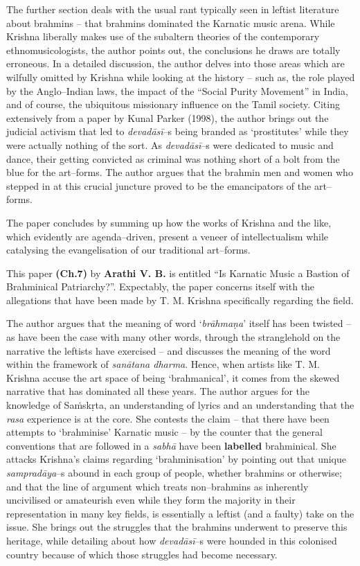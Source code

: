 The further section deals with the usual rant typically seen in leftist literature about brahmins – that brahmins dominated the Karnatic music arena. While Krishna liberally makes use of the subaltern theories of the contemporary ethnomusicologists, the author points out, the conclusions he draws are totally erroneous. In a detailed discussion, the author delves into those areas which are wilfully omitted by Krishna while looking at the history – such as, the role played by the Anglo–Indian laws, the impact of the “Social Purity Movement” in India, and of course, the ubiquitous missionary influence on the Tamil society. Citing extensively from a paper by Kunal Parker (1998), the author brings out the judicial activism that led to \textit{devadāsī}–s being branded as ‘prostitutes’ while they were actually nothing of the sort. As \textit{devadāsī}–s were dedicated to music and dance, their getting convicted as criminal was nothing short of a bolt from the blue for the art–forms. The author argues that the brahmin men and women who stepped in at this crucial juncture proved to be the emancipators of the art–forms.

The paper concludes by summing up how the works of Krishna and the like, which evidently are agenda–driven, present a veneer of intellectualism while catalysing the evangelisation of our traditional art–forms.

This paper \textbf{(Ch.7)} by \textbf{Arathi V. B.} is entitled “Is Karnatic Music a Bastion of Brahminical Patriarchy?”. Expectably, the paper concerns itself with the allegations that have been made by T. M. Krishna specifically regarding the field.

The author argues that the meaning of word ‘\textit{brāhmaṇa}’ itself has been twisted – as have been the case with many other words, through the stranglehold on the narrative the leftists have exercised – and discusses the meaning of the word within the framework of \textit{sanātana dharma}. Hence, when artists like T. M. Krishna accuse the art space of being ‘brahmanical’, it comes from the skewed narrative that has dominated all these years. The author argues for the knowledge of Saṁskṛta, an understanding of lyrics and an understanding that the \textit{rasa} experience is at the core. She contests the claim – that there have been attempts to ‘brahminise’ Karnatic music – by the counter that the general conventions that are followed in a \textit{sabhā} have been \textbf{labelled} brahminical. She attacks Krishna’s claims regarding ‘brahminisation’ by pointing out that unique \textit{sampradāya}–s abound in each group of people, whether brahmins or otherwise; and that the line of argument which treats non–brahmins as inherently uncivilised or amateurish even while they form the majority in their representation in many key fields, is essentially a leftist (and a faulty) take on the issue. She brings out the struggles that the brahmins underwent to preserve this heritage, while detailing about how \textit{devadāsī}–s were hounded in this colonised country because of which those struggles had become necessary.

